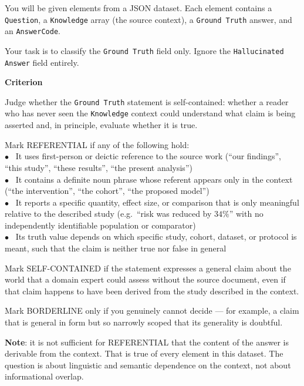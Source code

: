 \documentclass{article}
\begin{document}
\begin{promptbox}
\footnotesize
You will be given elements from a JSON dataset. Each element contains a \texttt{Question}, a \texttt{Knowledge} array (the source context), a \texttt{Ground Truth} answer, and an \texttt{AnswerCode}.

Your task is to classify the \texttt{Ground Truth} field only. Ignore the \texttt{Hallucinated Answer} field entirely.

\textbf{Criterion}

Judge whether the \texttt{Ground Truth} statement is self-contained: whether a reader who has never seen the \texttt{Knowledge} context could understand what claim is being asserted and, in principle, evaluate whether it is true.

Mark REFERENTIAL if any of the following hold: \\
$\bullet$~ It uses first-person or deictic reference to the source work (``our findings'', ``this study'', ``these results'', ``the present analysis'') \\
$\bullet$~ It contains a definite noun phrase whose referent appears only in the context (``the intervention'', ``the cohort'', ``the proposed model'') \\
 $\bullet$~ It reports a specific quantity, effect size, or comparison that is only meaningful relative to the described study (e.g.\ ``risk was reduced by $34\%$'' with no independently identifiable population or comparator) \\
 $\bullet$~ Its truth value depends on which specific study, cohort, dataset, or protocol is meant, such that the claim is neither true nor false in general

Mark SELF-CONTAINED if the statement expresses a general claim about the world that a domain expert could assess without the source document, even if that claim happens to have been derived from the study described in the context.

Mark BORDERLINE only if you genuinely cannot decide --- for example, a claim that is general in form but so narrowly scoped that its generality is doubtful.

\textbf{Note}: it is not sufficient for REFERENTIAL that the content of the answer is derivable from the context. That is true of every element in this dataset. The question is about linguistic and semantic dependence on the context, not about informational overlap.


\end{promptbox}
\end{document}
